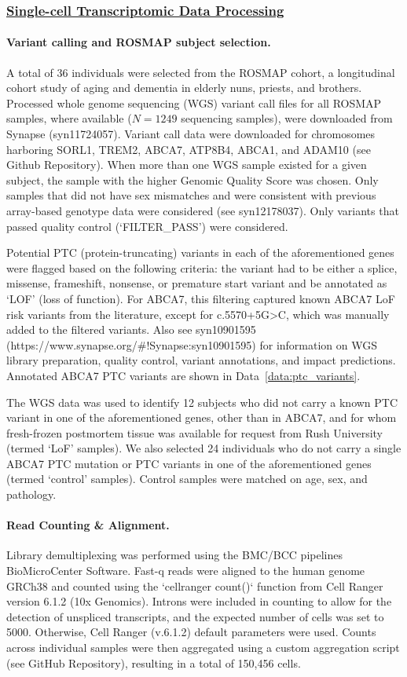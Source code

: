 \subsubsection{\underline{Single-cell Transcriptomic Data Processing}}

\paragraph{Variant calling and ROSMAP subject selection.}
A total of 36 individuals were selected from the ROSMAP cohort, a longitudinal cohort study of aging and dementia in elderly nuns, priests, and brothers. Processed whole genome sequencing (WGS) variant call files for all ROSMAP samples, where available ($N=1249$ sequencing samples), were downloaded from Synapse (syn11724057). Variant call data were downloaded for chromosomes harboring SORL1, TREM2, ABCA7, ATP8B4, ABCA1, and ADAM10 (see Github Repository). When more than one WGS sample existed for a given subject, the sample with the higher Genomic Quality Score was chosen. Only samples that did not have sex mismatches and were consistent with previous array-based genotype data were considered (see syn12178037). Only variants that passed quality control (‘FILTER_PASS’) were considered.

Potential PTC (protein-truncating) variants in each of the aforementioned genes were flagged based on the following criteria: the variant had to be either a splice, missense, frameshift, nonsense, or premature start variant and be annotated as ‘LOF’ (loss of function). For ABCA7, this filtering captured known ABCA7 LoF risk variants from the literature, except for c.5570+5G>C, which was manually added to the filtered variants. Also see syn10901595 (https://www.synapse.org/\#!Synapse:syn10901595) for information on WGS library preparation, quality control, variant annotations, and impact predictions. Annotated ABCA7 PTC variants are shown in Data~\ref{data:ptc_variants}.

The WGS data was used to identify 12 subjects who did not carry a known PTC variant in one of the aforementioned genes, other than in ABCA7, and for whom fresh-frozen postmortem tissue was available for request from Rush University (termed ‘LoF’ samples). We also selected 24 individuals who do not carry a single ABCA7 PTC mutation or PTC variants in one of the aforementioned genes (termed ‘control’ samples). Control samples were matched on age, sex, and pathology. 

\paragraph{Read Counting & Alignment.}
Library demultiplexing was performed using the BMC/BCC pipelines BioMicroCenter Software. Fast-q reads were aligned to the human genome GRCh38 and counted using the `cellranger count()` function from Cell Ranger version 6.1.2 (10x Genomics). Introns were included in counting to allow for the detection of unspliced transcripts, and the expected number of cells was set to 5000. Otherwise, Cell Ranger (v.6.1.2) default parameters were used. Counts across individual samples were then aggregated using a custom aggregation script (see GitHub Repository), resulting in a total of 150,456 cells.

